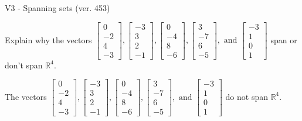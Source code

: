 \begin{exercise}
  \begin{exerciseTitle}V3 - Spanning sets (ver. 453)\end{exerciseTitle}
  \begin{exerciseStatement}
    Explain why the vectors \(\left[\begin{array}{r}
0 \\
-2 \\
4 \\
-3
\end{array}\right] , \left[\begin{array}{r}
-3 \\
3 \\
2 \\
-1
\end{array}\right] , \left[\begin{array}{r}
0 \\
-4 \\
8 \\
-6
\end{array}\right] , \left[\begin{array}{r}
3 \\
-7 \\
6 \\
-5
\end{array}\right] , \text{ and } \left[\begin{array}{r}
-3 \\
1 \\
0 \\
1
\end{array}\right]\) span or don't span \(\mathbb{R}^4\). 
	


  \end{exerciseStatement}
  \begin{exerciseAnswer}
   The vectors \(\left[\begin{array}{r}
0 \\
-2 \\
4 \\
-3
\end{array}\right] , \left[\begin{array}{r}
-3 \\
3 \\
2 \\
-1
\end{array}\right] , \left[\begin{array}{r}
0 \\
-4 \\
8 \\
-6
\end{array}\right] , \left[\begin{array}{r}
3 \\
-7 \\
6 \\
-5
\end{array}\right] , \text{ and } \left[\begin{array}{r}
-3 \\
1 \\
0 \\
1
\end{array}\right]\) 
  	 do not  
	span \(\mathbb{R}^4\).
  



\end{exerciseAnswer}
\end{exercise}
